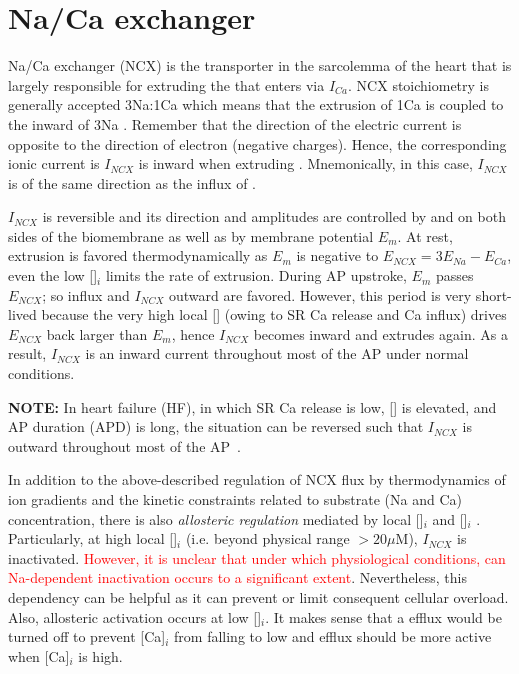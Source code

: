\section{Na/Ca exchanger}
\label{sec:naca-exchange}

Na/Ca exchanger (NCX) is the  transporter in the sarcolemma
of the heart that is largely responsible for extruding the 
that enters via $I_{Ca}$. NCX stoichiometry is generally accepted
3Na:1Ca which means that the extrusion of 1Ca is coupled to the inward
of 3Na \citep{egger2000pbn,kang2004mtm}. Remember that the direction of
the electric current is opposite to the direction of electron
(negative charges).  Hence, the corresponding ionic current is
$I_{NCX}$ is inward when extruding . Mnemonically, in this
case, $I_{NCX}$ is of the same direction as the influx of .

$I_{NCX}$ is reversible and its direction and amplitudes are
controlled by  and  on both sides of the biomembrane
as well as by membrane potential $E_m$.  At rest,  extrusion
is favored thermodynamically as $E_m$ is negative to $E_{NCX} =
3E_{Na} - E_{Ca}$, even the low []$_i$ limits the rate of
 extrusion. During AP upstroke, $E_m$ passes $E_{NCX}$; so
 influx and $I_{NCX}$ outward are favored. However, this
period is very short-lived because the very high local []
(owing to SR Ca release and Ca influx) drives $E_{NCX}$ back larger
than $E_m$, hence $I_{NCX}$ becomes inward and extrudes 
again. As a result, $I_{NCX}$ is an inward current throughout most of
the AP under normal conditions.

{\bf NOTE:} In heart failure (HF), in which SR Ca release is low,
[] is elevated, and AP duration (APD) is long, the situation
can be reversed such that $I_{NCX}$ is outward throughout most of the
AP~\citep{weber2003drs}.

In addition to the above-described regulation of NCX flux by
thermodynamics of ion gradients and the kinetic constraints related to
substrate (Na and Ca) concentration, there is also
{\it allosteric regulation} mediated by local []$_i$ and
[]$_i$ \citep{philipson2000sce}. Particularly, at high local
[]$_i$ (i.e. beyond physical range $>20\mu$M), $I_{NCX}$ is
inactivated.
\textcolor{red}{However, it is unclear that under which physiological
  conditions, can Na-dependent inactivation occurs to a significant
  extent}.
Nevertheless, this dependency can be helpful as it can prevent or
limit consequent cellular  overload. Also, allosteric
activation occurs at low []$_i$. It makes sense that a
 efflux would be turned off to prevent [Ca]$_i$ from falling
to low and  efflux should be more active when [Ca]$_i$ is
high.

